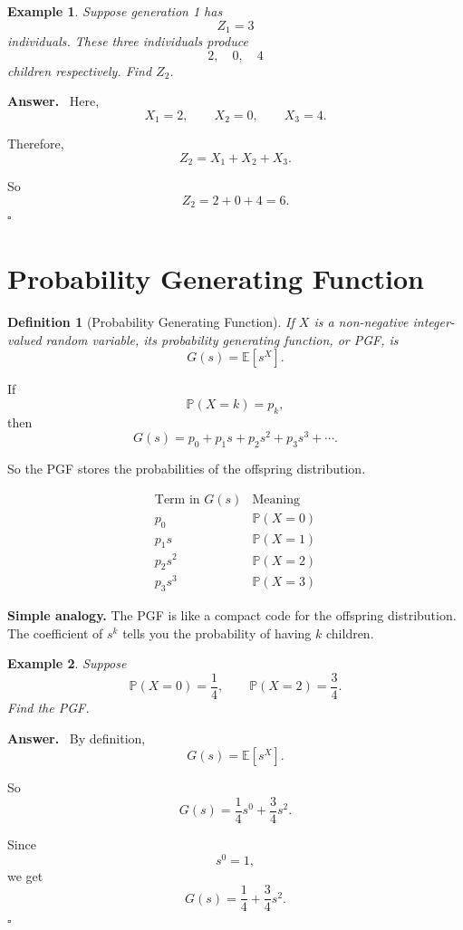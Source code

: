 \documentclass[12pt,a4paper]{article}
\theoremstyle{notestyle}
\newtheorem{definition}{Definition}
\newtheorem{example}{Example}
\newenvironment{answer}
{\par\textbf{Answer.}\ }
{\hfill$\square$\par}
\newcommand{\Prob}{\mathbb{P}}
\newcommand{\E}{\mathbb{E}}
\begin{document}
\begin{example}
Suppose generation 1 has
\[
Z_1=3
\]
individuals. These three individuals produce
\[
2,\quad 0,\quad 4
\]
children respectively. Find $Z_2$.
\end{example}

\begin{answer}
Here,
\[
X_1=2,\qquad X_2=0,\qquad X_3=4.
\]

Therefore,
\[
Z_2=X_1+X_2+X_3.
\]

So
\[
Z_2=2+0+4=6.
\]
\end{answer}

\section{Probability Generating Function}

\begin{definition}[Probability Generating Function]
If $X$ is a non-negative integer-valued random variable, its probability generating function, or PGF, is
\[
G(s)=\E[s^X].
\]
\end{definition}

If
\[
\Prob(X=k)=p_k,
\]
then
\[
G(s)=p_0+p_1s+p_2s^2+p_3s^3+\cdots.
\]

So the PGF stores the probabilities of the offspring distribution.

\[
\begin{array}{c|c}
\text{Term in }G(s) & \text{Meaning}\\
\hline
p_0 & \Prob(X=0)\\
p_1s & \Prob(X=1)\\
p_2s^2 & \Prob(X=2)\\
p_3s^3 & \Prob(X=3)
\end{array}
\]

\textbf{Simple analogy.} The PGF is like a compact code for the offspring distribution. The coefficient of $s^k$ tells you the probability of having $k$ children.

\begin{example}
Suppose
\[
\Prob(X=0)=\frac14,\qquad \Prob(X=2)=\frac34.
\]
Find the PGF.
\end{example}

\begin{answer}
By definition,
\[
G(s)=\E[s^X].
\]

So
\[
G(s)=\frac14s^0+\frac34s^2.
\]

Since
\[
s^0=1,
\]
we get
\[
\boxed{G(s)=\frac14+\frac34s^2.}
\]
\end{answer}
\end{document}
